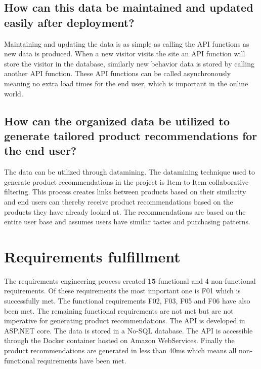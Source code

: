 \subsection{How can this data be maintained and updated easily after deployment?}
Maintaining and updating the data is as simple as calling the API functions as new data is produced. When a new visitor visits the site an API function will store the visitor in the database, similarly new behavior data is stored by calling another API function. These API functions can be called asynchronously meaning no extra load times for the end user, which is important in the online world.

\subsection{How can the organized data be utilized to generate tailored product recommendations for the end user?}
The data can be utilized through datamining. The datamining technique used to generate product recommendations in the project is Item-to-Item collaborative filtering. This process creates links between products based on their similarity and end users can thereby receive product recommendations based on the products they have already looked at. The recommendations are based on the entire user base and assumes users have similar tastes and purchasing patterns.

\section{Requirements fulfillment}
The requirements engineering process created \textbf{15} functional and 4 non-functional requirements. Of these requirements the most important one is F01 which is successfully met. The functional requirements F02, F03, F05 and F06 have also been met. The remaining functional requirements are not met but are not imperative for generating product recommendations. The API is developed in ASP.NET core. The data is stored in a No-SQL database. The API is accessible through the Docker container hosted on Amazon WebServices. Finally the product recommendations are generated in less than 40ms which means all non-functional requirements have been met.
